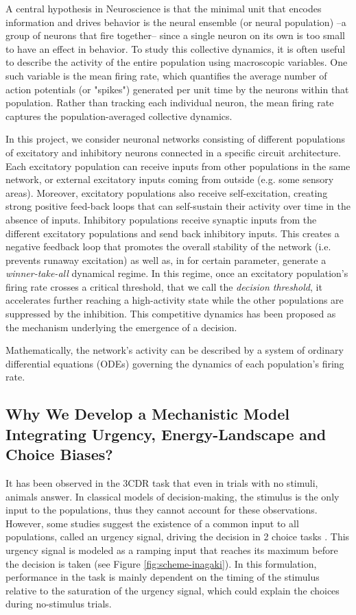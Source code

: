 \documentclass[../main.tex]{subfiles}
\begin{document}
A central hypothesis in Neuroscience is that the minimal unit that encodes information and drives behavior is the neural ensemble (or neural population) –a group of neurons that fire together– since a single neuron on its own is too small to have an effect in behavior. To study this collective dynamics, it is often useful to describe the activity of the entire population using macroscopic variables. One such variable is the mean firing rate, which quantifies the average number of action potentials (or "spikes") generated per unit time by the neurons within that population. Rather than tracking each individual neuron, the mean firing rate captures the population-averaged collective dynamics.

In this project, we consider neuronal networks consisting of different populations of excitatory and inhibitory neurons connected in a specific circuit architecture. Each excitatory population can receive inputs from other populations in the same network, or external excitatory inputs coming from outside (e.g. some sensory areas). Moreover, excitatory populations also receive self-excitation, creating strong positive feed-back loops that can self-sustain their activity over time in the absence of inputs.
Inhibitory populations receive synaptic inputs from the different excitatory populations and send back inhibitory inputs. This creates a negative feedback loop that promotes the overall stability of the network (i.e. prevents runaway excitation) as well as, in for certain parameter, generate  a \emph{winner-take-all} dynamical regime. In this regime, once an excitatory population’s firing rate crosses a critical threshold, that we call the \textit{decision threshold}, it accelerates further reaching a high-activity state while the other populations are suppressed by the inhibition. This competitive dynamics has been proposed as the mechanism underlying the emergence of a decision.

Mathematically, the network's activity can be described by a system of ordinary differential equations (ODEs) governing the dynamics of each population's firing rate.


\subsection{Why We Develop a Mechanistic Model Integrating Urgency, Energy-Landscape and Choice Biases?} %
\label{sec:Mechanisticmodel}
It has been observed in the 3CDR task that even in trials with no stimuli, animals answer. In classical models of decision-making, the stimulus is the only input to the populations, thus they cannot account for these observations. However, some studies suggest the existence of a common input to all populations, called an urgency signal, driving the decision in 2 choice tasks \cite{inagaki2019}.  This urgency signal is modeled as a ramping input that reaches its maximum before the decision is taken (see Figure \ref{fig:scheme-inagaki}). In this formulation, performance in the task is mainly dependent on the timing of the stimulus relative to the saturation of the urgency signal, which could explain the choices during no-stimulus trials.
\end{document}
